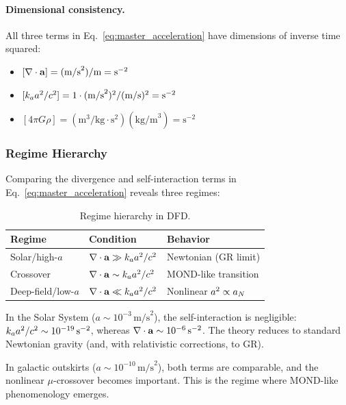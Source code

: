 \paragraph{Dimensional consistency.}
All three terms in Eq.~\eqref{eq:master_acceleration} have dimensions 
of inverse time squared:
\begin{itemize}
\item $[\nabla \cdot \mathbf{a}] = (\text{m/s}^2)/\text{m} = \text{s}^{-2}$
\item $[k_aa^2/c^2] = 1 \cdot (\text{m/s}^2)^2/(\text{m/s})^2 = \text{s}^{-2}$
\item $[4\pi G\rho] = (\text{m}^3/\text{kg}\cdot\text{s}^2)(\text{kg/m}^3) = \text{s}^{-2}$
\end{itemize}

\subsubsection{Regime Hierarchy}

Comparing the divergence and self-interaction terms in 
Eq.~\eqref{eq:master_acceleration} reveals three regimes:

\begin{table}[h]
\caption{Regime hierarchy in DFD.}
\label{tab:regimes}
\begin{ruledtabular}
\begin{tabular}{lll}
Regime & Condition & Behavior \\
\hline
Solar/high-$a$ & $\nabla\cdot\mathbf{a} \gg k_aa^2/c^2$ & 
  Newtonian (GR limit) \\
Crossover & $\nabla\cdot\mathbf{a} \sim k_aa^2/c^2$ & 
  MOND-like transition \\
Deep-field/low-$a$ & $\nabla\cdot\mathbf{a} \ll k_aa^2/c^2$ & 
  Nonlinear $a^2 \propto a_N$ \\
\end{tabular}
\end{ruledtabular}
\end{table}

In the Solar System ($a \sim 10^{-3}\,\text{m/s}^2$), the self-interaction 
is negligible: $k_aa^2/c^2 \sim 10^{-19}\,\text{s}^{-2}$, whereas 
$\nabla\cdot\mathbf{a} \sim 10^{-6}\,\text{s}^{-2}$. The theory reduces to 
standard Newtonian gravity (and, with relativistic corrections, to GR).

In galactic outskirts ($a \sim 10^{-10}\,\text{m/s}^2$), both terms 
are comparable, and the nonlinear $\mu$-crossover becomes important. 
This is the regime where MOND-like phenomenology emerges.

